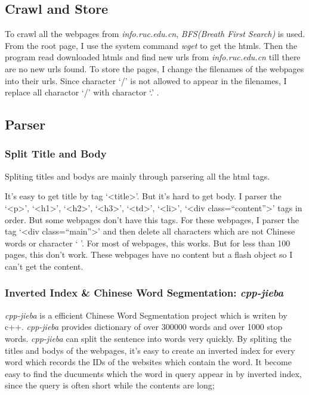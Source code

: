 \documentclass[a4paper]{article}
\begin{document}
\subsection{Crawl and Store}

To crawl all the webpages from \emph{info.ruc.edu.cn}, \emph{BFS(Breath First Search)} is used. From the root page, I use the system command \emph{wget} to get the htmls. Then the program read downloaded htmls and find new urls from \emph{info.ruc.edu.cn} till there are no new urls found. 
To store the pages, I change the filenames of the webpages into their urls. Since character `/' is not allowed to appear in the filenames, I replace all charactor `/' with charactor `.' .

\subsection{Parser}

\subsubsection{Split Title and Body}

Spliting titles and bodys are mainly through parsering all the html tags. 

It's easy to get title by tag `<title>'. But it's hard to get body. I parser the `<p>', `<h1>', `<h2>', `<h3>', `<td>', `<li>', `<div class=``content''>' tags in order. But some webpages don't have this tags. For these webpages, I parser the tag `<div class=``main''>' and then delete all characters which are not Chinese words or character ` '. For most of webpages, this works. But for less than 100 pages, this don't work. These webpages have no content but a flash object so I can't get the content.

\subsubsection{Inverted Index \& Chinese Word Segmentation: \emph{cpp-jieba}}

\emph{cpp-jieba} is a efficient Chinese Word Segmentation project which is writen by c++. \emph{cpp-jieba} provides dictionary of over 300000 words and over 1000 stop words. \emph{cpp-jieba} can split the sentence into words very quickly.
By spliting the titles and bodys of the webpages, it's easy to create an inverted index for every word which records the IDs of the websites which contain the word. It become easy to find the ducuments which the word in query appear in by inverted index, since the query is often short while the contents are long; 
\end{document}
